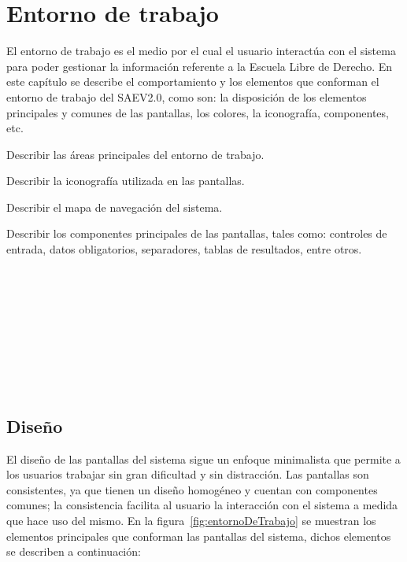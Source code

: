 
\section{Entorno de trabajo}

    El entorno de trabajo es el medio por el cual el usuario interactúa con el sistema para poder gestionar la información referente a la Escuela Libre de Derecho. En este capítulo se describe el comportamiento y los elementos que conforman el entorno de trabajo del SAEV2.0, como son: la disposición de los elementos principales y comunes de las pantallas, los colores, la iconografía, componentes, etc. \bigskip

    \begin{objetivos}
      \item Describir las áreas principales del entorno de trabajo.
      \item Describir la iconografía utilizada en las pantallas.
      \item Describir el mapa de navegación del sistema.
      \item Describir los componentes principales de las pantallas, tales como: controles de entrada, datos obligatorios, separadores, tablas de resultados, entre otros.
    \end{objetivos}
\\\\\\\\\\\\\\\\

\subsection{Diseño}

  El diseño de las pantallas del sistema sigue un enfoque minimalista que permite a los usuarios trabajar sin gran dificultad y sin distracción. 
  Las pantallas son consistentes, ya que tienen un diseño homogéneo y cuentan con componentes comunes; la consistencia facilita al usuario la interacción
  con el sistema a medida que hace uso del mismo. En la figura~\ref{fig:entornoDeTrabajo} se muestran los elementos principales que conforman las pantallas del sistema, 
  dichos elementos se describen a continuación:

